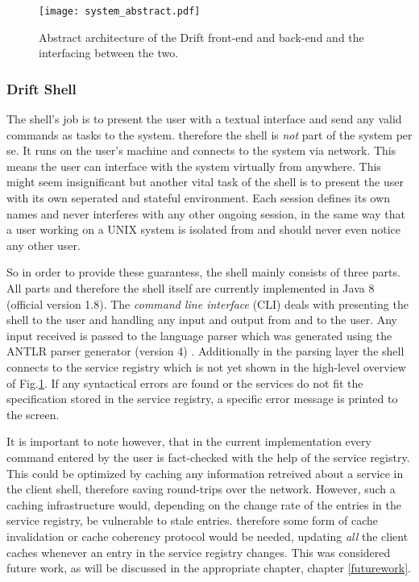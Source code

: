 \begin{figure}[h]
  \texttt{[image: system\_abstract.pdf]}
  \caption{Abstract architecture of the Drift front-end and back-end
           and the interfacing between the two.}
  \label{system-abstract}
\end{figure}

\subsubsection{Drift Shell}
\label{driftshell}

The shell's job is to present the user with a textual interface
and send any valid commands as tasks to the system. therefore
the shell is \textit{not} part of the system per se. It runs
on the user's machine and connects to the system via network.
This means the user can interface with the system virtually from
anywhere.
This might seem insignificant but another vital task of
the shell is to present the user with its own
seperated and stateful environment. Each session defines its own
names and never interferes with any other ongoing session, in the
same way that a user working on a UNIX system is isolated from
and should never even notice any other user.

So in order to provide these guarantess, the shell mainly consists of
three parts. All parts and therefore the shell itself are currently
implemented in Java 8 (official version 1.8).
The \textit{command line interface} (CLI) deals with presenting
the shell to the user and handling any input and output from
and to the user. Any input received is passed to the
language parser which was generated using the ANTLR parser
generator (version 4) \cite{antlr}. Additionally in the
parsing layer the shell connects to the service registry which
is not yet shown in the high-level overview of Fig.\ref{system-abstract}.
If any syntactical errors are found or the services do not fit
the specification stored in the service registry, a specific error
message is printed to the screen.

It is important to note however, that in the current implementation
every command entered by the user is fact-checked with the help
of the service registry. This could be optimized by caching any
information retreived about a service in the client shell, therefore
saving round-trips over the network. However, such a caching
infrastructure would, depending on the change rate of the entries
in the service registry, be vulnerable to stale entries. therefore
some form of cache invalidation or cache coherency protocol would
be needed, updating \textit{all} the client caches
whenever an entry in the service registry changes.
This was considered future work, as will be discussed in the
appropriate chapter, chapter \ref{futurework}.


